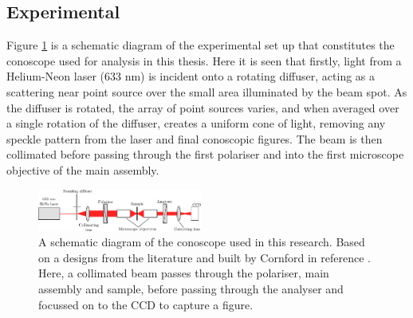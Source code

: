 \subsection{Experimental}
Figure \ref{fig:conoscope_schem} is a schematic diagram of the experimental set up that constitutes the conoscope used for analysis in this thesis. Here it is seen that firstly, light from a Helium-Neon laser (633 nm) is incident onto a rotating diffuser, acting as a scattering near point source over the small area illuminated by the beam spot. As the diffuser is rotated, the array of point sources varies, and when averaged over a single rotation of the diffuser, creates a uniform cone of light, removing any speckle pattern from the laser and final conoscopic figures. The beam is then collimated before passing through the first polariser and into the first microscope objective of the main assembly.


\begin{figure}
\begin{center}
\includegraphics[width=0.48\textwidth]{Figures/conoscopy/conoscope_setup}
\end{center}
\caption[Schematic diagram of the conoscope setup]{\label{fig:conoscope_schem}A schematic diagram of the conoscope used in this research. Based on a designs from the literature \cite{Parry-Jones2002,Fujikawa1993} and built by Cornford in reference \cite{Cornford2008}. Here, a collimated beam passes through the polariser, main assembly and sample, before passing through the analyser and focussed on to the CCD to capture a figure.}
\end{figure}

